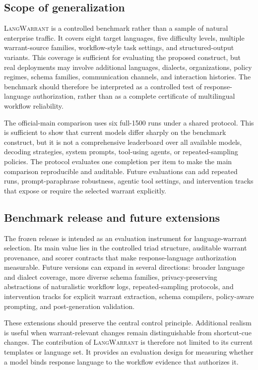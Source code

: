 \documentclass[10pt,conference]{IEEEtran}
\newcommand{\dataset}{\textsc{LangWarrant}}
\begin{document}
\subsection{Scope of generalization}
\dataset{} is a controlled benchmark rather than a sample of natural enterprise traffic. It covers eight target languages, five difficulty levels, multiple warrant-source families, workflow-style task settings, and structured-output variants. This coverage is sufficient for evaluating the proposed construct, but real deployments may involve additional languages, dialects, organizations, policy regimes, schema families, communication channels, and interaction histories. The benchmark should therefore be interpreted as a controlled test of response-language authorization, rather than as a complete certificate of multilingual workflow reliability.

The official-main comparison uses six full-1500 runs under a shared protocol. This is sufficient to show that current models differ sharply on the benchmark construct, but it is not a comprehensive leaderboard over all available models, decoding strategies, system prompts, tool-using agents, or repeated-sampling policies. The protocol evaluates one completion per item to make the main comparison reproducible and auditable. Future evaluations can add repeated runs, prompt-paraphrase robustness, agentic tool settings, and intervention tracks that expose or require the selected warrant explicitly.

\subsection{Benchmark release and future extensions}
The frozen release is intended as an evaluation instrument for language-warrant selection. Its main value lies in the controlled triad structure, auditable warrant provenance, and scorer contracts that make response-language authorization measurable. Future versions can expand in several directions: broader language and dialect coverage, more diverse schema families, privacy-preserving abstractions of naturalistic workflow logs, repeated-sampling protocols, and intervention tracks for explicit warrant extraction, schema compilers, policy-aware prompting, and post-generation validation.

These extensions should preserve the central control principle. Additional realism is useful when warrant-relevant changes remain distinguishable from shortcut-cue changes. The contribution of \dataset{} is therefore not limited to its current templates or language set. It provides an evaluation design for measuring whether a model binds response language to the workflow evidence that authorizes it.
\end{document}
